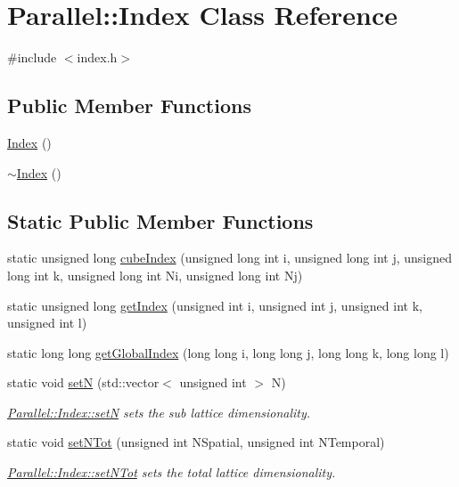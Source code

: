 \hypertarget{class_parallel_1_1_index}{}\section{Parallel\+::Index Class Reference}
\label{class_parallel_1_1_index}


{\ttfamily \#include $<$index.\+h$>$}

\subsection*{Public Member Functions}
\begin{DoxyCompactItemize}
\item 
\mbox{\hyperlink{class_parallel_1_1_index_ae767eedba252c26cc0dc5e60f0b9ed9b}{Index}} ()
\item 
\mbox{\hyperlink{class_parallel_1_1_index_a76b7ed4e9cb0b1540264567f84896032}{$\sim$\+Index}} ()
\end{DoxyCompactItemize}
\subsection*{Static Public Member Functions}
\begin{DoxyCompactItemize}
\item 
static unsigned long \mbox{\hyperlink{class_parallel_1_1_index_ac406d7ceb12e986a66d64ef98fcef5d3}{cube\+Index}} (unsigned long int i, unsigned long int j, unsigned long int k, unsigned long int Ni, unsigned long int Nj)
\item 
static unsigned long \mbox{\hyperlink{class_parallel_1_1_index_af31faeef1369fdc0997d1910e008bfe2}{get\+Index}} (unsigned int i, unsigned int j, unsigned int k, unsigned int l)
\item 
static long long \mbox{\hyperlink{class_parallel_1_1_index_aaa2650024b4e91dc86d2bdc568c8f57d}{get\+Global\+Index}} (long long i, long long j, long long k, long long l)
\item 
static void \mbox{\hyperlink{class_parallel_1_1_index_acbf43868aa2efc7ecf63b5b490fc00a0}{setN}} (std\+::vector$<$ unsigned int $>$ N)
\begin{DoxyCompactList}\small\item\em \mbox{\hyperlink{class_parallel_1_1_index_acbf43868aa2efc7ecf63b5b490fc00a0}{Parallel\+::\+Index\+::setN}} sets the sub lattice dimensionality. \end{DoxyCompactList}\item 
static void \mbox{\hyperlink{class_parallel_1_1_index_a125dc4d990ded636c91b959474c27d1f}{set\+N\+Tot}} (unsigned int N\+Spatial, unsigned int N\+Temporal)
\begin{DoxyCompactList}\small\item\em \mbox{\hyperlink{class_parallel_1_1_index_a125dc4d990ded636c91b959474c27d1f}{Parallel\+::\+Index\+::set\+N\+Tot}} sets the total lattice dimensionality. \end{DoxyCompactList}\end{DoxyCompactItemize}


